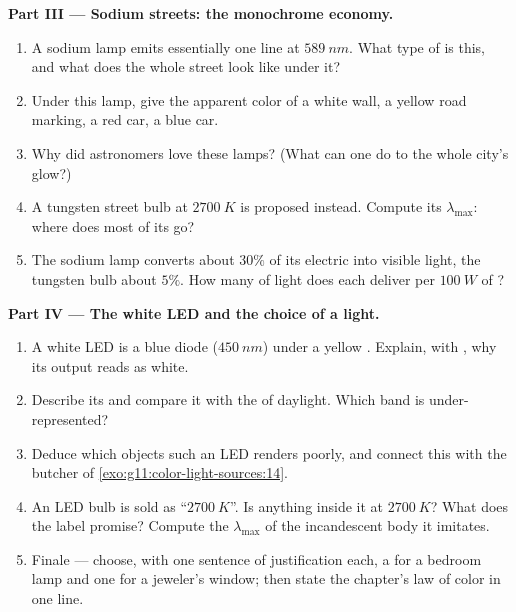 \begin{problem}
\medskip
\noindent\textbf{Part III --- Sodium streets: the monochrome economy.}
\begin{enumerate}[resume]
  \item A  sodium lamp emits essentially one line at
        $\qty{589}{nm}$. What type of  is this, and what does
        the whole street look like under it?
  \item Under this lamp, give the apparent color of a white wall, a
        yellow road marking, a red car, a blue car.
  \item Why did astronomers love these lamps? (What can one  do
        to the whole city's glow?)
  \item A tungsten street bulb at $\qty{2700}{K}$ is proposed instead.
        Compute its $\lambda_{\max}$: where does most of its  go?
  \item The sodium lamp converts about $30\%$ of its electric 
        into visible light, the tungsten bulb about $5\%$. How many
         of light does each deliver per $\qty{100}{W}$ of ?
\end{enumerate}

\medskip
\noindent\textbf{Part IV --- The white LED and the choice of a light.}
\begin{enumerate}[resume]
  \item A white LED is a blue diode ($\qty{450}{nm}$) under a yellow
        . Explain, with , why its output
        reads as white.
  \item Describe its  and compare it with the  of daylight. Which band is under-represented?
  \item Deduce which objects such an LED renders poorly, and connect
        this with the butcher of \cref{exo:g11:color-light-sources:14}.
  \item An LED bulb is sold as ``$\qty{2700}{K}$''. Is anything inside
        it at $\qty{2700}{K}$? What does the label promise? Compute the
        $\lambda_{\max}$ of the incandescent body it imitates.
  \item Finale --- choose, with one sentence of justification each, a
         for a bedroom lamp and one for a jeweler's
        window; then state the chapter's law of color in one line.
\end{enumerate}
\end{problem}

